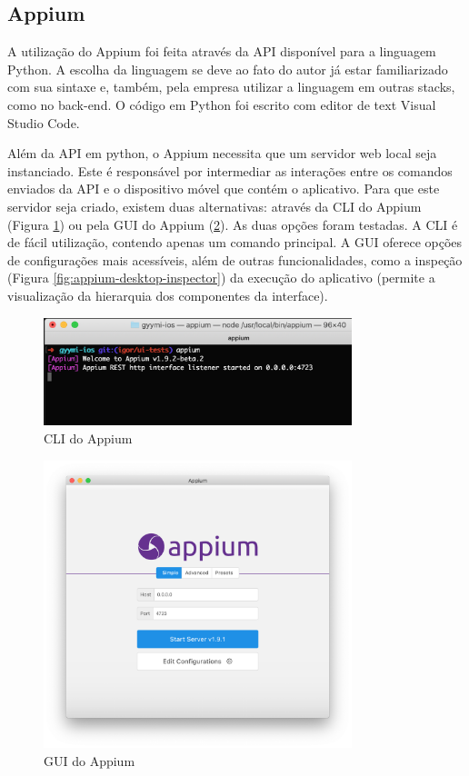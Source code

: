 \subsection{Appium}
A utilização do Appium foi feita através da API disponível para a linguagem Python. A escolha da linguagem se deve ao fato do autor já estar familiarizado com sua sintaxe e, também, pela empresa utilizar a linguagem em outras stacks, como no back-end. O código em Python foi escrito com editor de text Visual Studio Code.

Além da API em python, o Appium necessita que um servidor web local seja instanciado. Este é responsável por intermediar as interações entre os comandos enviados da API e o dispositivo móvel que contém o aplicativo. Para que este servidor seja criado, existem duas alternativas: através da CLI do Appium (Figura \ref{fig:appium-cli}) ou pela GUI do Appium (\ref{fig:appium-desktop}). As duas opções foram testadas. A CLI é de fácil utilização, contendo apenas um comando principal. A GUI oferece opções de configurações mais acessíveis, além de outras funcionalidades, como a inspeção (Figura \ref{fig:appium-desktop-inspector}) da execução do aplicativo (permite a visualização da hierarquia dos componentes da interface).

\begin{figure}[H]
    \centering
    \includegraphics[width=0.8\textwidth]{pfc/figuras/appium-cli.png}
    \caption{CLI do Appium}
    \label{fig:appium-cli}
\end{figure}

\begin{figure}[H]
    \centering
    \includegraphics[width=0.8\textwidth]{pfc/figuras/appium-desktop.png}
    \caption{GUI do Appium}
    \label{fig:appium-desktop}
\end{figure}

